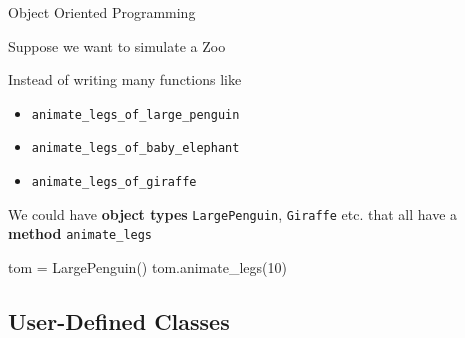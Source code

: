 \begin{frame}[fragile]{Object Oriented Programming}

    Suppose we want to simulate a Zoo

    \vspace{0.5em}

    Instead of writing many functions like

    \begin{itemize}
        \item {\tt animate\_legs\_of\_large\_penguin}
        \item {\tt animate\_legs\_of\_baby\_elephant}
        \item {\tt animate\_legs\_of\_giraffe}
    \end{itemize}

    \vspace{1em}

    We could have \textbf{object types} {\tt LargePenguin}, {\tt Giraffe} etc. that all have a \textbf{method} {\tt animate\_legs}

    \begin{pythoncode}
    tom = LargePenguin()
    tom.animate_legs(10)
    \end{pythoncode}

\end{frame}

\subsection{User-Defined Classes}

